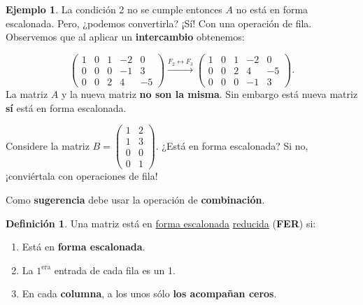 \documentclass[12pt]{article}
\theoremstyle{plain}
\theoremstyle{definition}
\newtheorem*{Def}{Definición}       %
\newtheorem{Ex}[Th]{Ejemplo}           %
\theoremstyle{remark}
\renewcommand{\:}{\colon}           %
\newcommand{\un}[1]{\underline{#1}}
\begin{document}
\begin{multicols}{2}
\begin{Ex}
La condición 2 no se cumple entonces $A$ no está en forma escalonada. Pero, ¿podemos convertirla? ¡Sí! Con una operación de fila. Observemos que al aplicar un \textbf{intercambio} obtenemos:

$$\begin{pmatrix}
  1&0&1&-2&0\\ 0&0&0&-1&3\\ 0&0&2&4&-5
\end{pmatrix}\xrightarrow[]{F_2\leftrightarrow F_3}\begin{pmatrix}
  1&0&1&-2&0\\ 0&0&2&4&-5\\ 0&0&0&-1&3
\end{pmatrix}.$$
La matriz $A$ y la nueva matriz \textbf{no son la misma}. Sin embargo está nueva matriz \textbf{sí} está en forma escalonada.
\end{Ex}

\begin{ptcbP}
Considere la matriz $B=\begin{pmatrix}
  1&2\\1&3\\0&0\\0&1
\end{pmatrix}$. ¿Está en forma escalonada? Si no, ¡conviértala con operaciones de fila!\par Como \textbf{sugerencia} debe usar la operación de \textbf{combinación}. 
\end{ptcbP}
\vspace{5cm}

\begin{Def}
  Una matriz está en \un{forma escalonada} \un{reducida} (\textbf{FER}) si:
  \begin{enumerate}
    \item Está en \textbf{forma escalonada}.
    \item La $1^{\text{era}}$ entrada de cada fila es un 1.
    \item En cada \textbf{columna}, a los unos sólo \textbf{los acompañan ceros}.
  \end{enumerate}
\end{Def}


\end{multicols}
\end{document}
